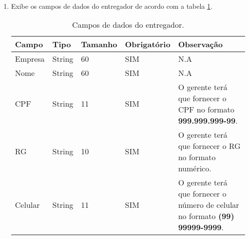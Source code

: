 \begin{enumerate}[label=RN\arabic*]
	\item Exibe os campos de dados do entregador de acordo com a tabela \ref{uc003_tb_rn1}. \label{uc003_rn:1}
	\begin{table}[htb]
		\ABNTEXfontereduzida
		\caption[Campos de dados do entregador]{Campos de dados do entregador.}
		\label{uc003_tb_rn1}
		\begin{tabular}{|p{3.0cm}|p{2.0cm}|p{1.5cm}|p{2.0cm}|p{5.75cm}|}
			\hline
			\textbf{Campo} & \textbf{Tipo} & \textbf{Tamanho} & \textbf{Obrigatório} & \textbf{Observação}                                                                  \\ \hline
			Empresa        & String        & 60               & SIM                  & N.A                                                                                  \\ \hline
			Nome           & String        & 60               & SIM                  & N.A                                                                                  \\ \hline
			CPF            & String        & 11               & SIM                  & O gerente terá que fornecer o CPF no formato \textbf{999.999.999-99}.                \\ \hline
			RG             & String        & 10               & SIM                  & O gerente terá que fornecer o RG no formato numérico.                                \\ \hline
			Celular        & String        & 11               & SIM                  & O gerente terá que fornecer o número de celular no formato \textbf{(99) 99999-9999}. \\ \hline
		\end{tabular}
	\end{table}
\end{enumerate}